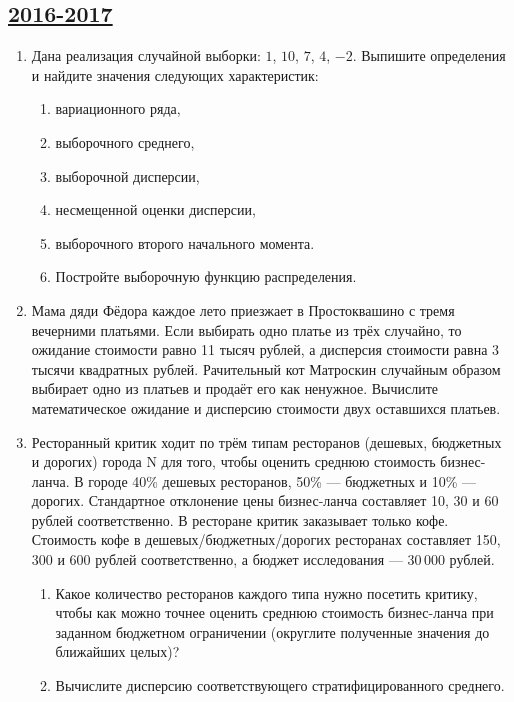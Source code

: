 \newpage
\subsection[2016-2017]{\hyperref[sec:sol_kr_03_2016_2017]{2016-2017}}
\label{sec:kr_03_2016_2017}

\begin{enumerate}

\item Дана реализация случайной выборки: $1$, $10$, $7$, $4$, $-2$. Выпишите
определения и найдите значения следующих характеристик:
\begin{enumerate}
  \item вариационного ряда,
  \item выборочного среднего,
  \item выборочной дисперсии,
  \item несмещенной оценки дисперсии,
  \item выборочного второго начального момента.
  \item Постройте выборочную функцию распределения.
\end{enumerate}


\item
Мама дяди Фёдора каждое лето приезжает в Простоквашино с тремя вечерними платьями.
Если выбирать одно платье из трёх случайно, то ожидание стоимости равно 11 тысяч рублей,
а дисперсия стоимости равна 3 тысячи квадратных рублей.
Рачительный кот Матроскин случайным образом выбирает одно из платьев и продаёт его как ненужное. Вычислите математическое ожидание и дисперсию стоимости двух оставшихся платьев.

\item
Ресторанный критик ходит по трём типам ресторанов (дешевых, бюджетных и дорогих)
города N для того, чтобы оценить среднюю стоимость бизнес-ланча. В городе 40\%
дешевых ресторанов, 50\% — бюджетных и 10\% — дорогих. Стандартное отклонение
цены бизнес-ланча составляет 10, 30 и 60 рублей соответственно. В ресторане
критик заказывает только кофе. Стоимость кофе в дешевых/бюджетных/дорогих ресторанах
составляет 150, 300 и 600 рублей соответственно, а бюджет исследования — 30\,000 рублей.
\begin{enumerate}
  \item Какое количество ресторанов каждого типа нужно посетить критику, чтобы
	как можно точнее оценить среднюю стоимость бизнес-ланча при заданном бюджетном
	ограничении (округлите полученные значения до ближайших целых)?
  \item Вычислите дисперсию соответствующего стратифицированного среднего.
\end{enumerate}


\end{enumerate}
